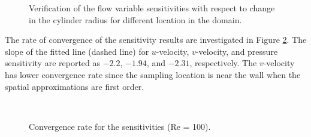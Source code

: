 \begin{figure}[H]
{    }
    \quad
    \caption{Verification of the flow variable sensitivities with respect to change in the cylinder radius for different location in the domain.}
    \label{fig:C4_flowOverCylinderSensitivityValidation}
\end{figure}
%
The rate of convergence of the sensitivity results are investigated in Figure \ref{fig:C4_flowOverCylinderSArateOfConvergence}. The slope of the fitted line (dashed line) for $u$-velocity, $v$-velocity, and pressure sensitivity are reported as $-2.2$, $-1.94$, and $-2.31$, respectively. The $v$-velocity has lower convergence rate since the sampling location is near the wall when the spatial approximations are first order.
%
\begin{figure}[H]
    \centering
    \quad
    \\
    \caption{Convergence rate for the sensitivities (Re = 100).}
    \label{fig:C4_flowOverCylinderSArateOfConvergence}
\end{figure}
